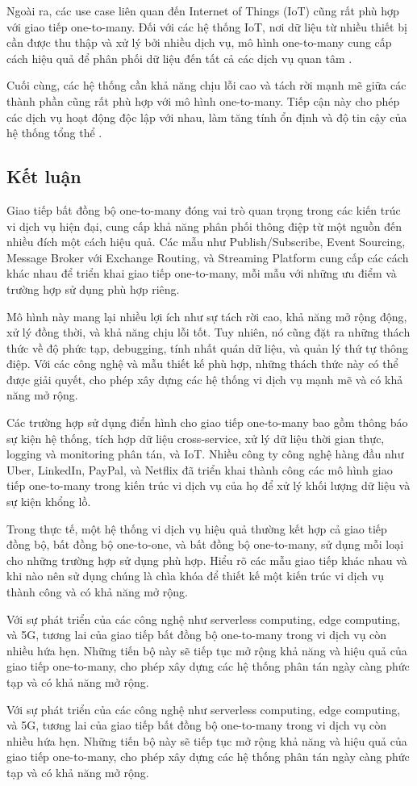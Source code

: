 Ngoài ra, các use case liên quan đến Internet of Things (IoT) cũng rất phù hợp với giao tiếp one-to-many. Đối với các hệ thống IoT, nơi dữ liệu từ nhiều thiết bị cần được thu thập và xử lý bởi nhiều dịch vụ, mô hình one-to-many cung cấp cách hiệu quả để phân phối dữ liệu đến tất cả các dịch vụ quan tâm \cite{indrasiri2020}.

Cuối cùng, các hệ thống cần khả năng chịu lỗi cao và tách rời mạnh mẽ giữa các thành phần cũng rất phù hợp với mô hình one-to-many. Tiếp cận này cho phép các dịch vụ hoạt động độc lập với nhau, làm tăng tính ổn định và độ tin cậy của hệ thống tổng thể \cite{fowler2002}.

\subsection{Kết luận}
Giao tiếp bất đồng bộ one-to-many đóng vai trò quan trọng trong các kiến trúc vi dịch vụ hiện đại, cung cấp khả năng phân phối thông điệp từ một nguồn đến nhiều đích một cách hiệu quả. Các mẫu như Publish/Subscribe, Event Sourcing, Message Broker với Exchange Routing, và Streaming Platform cung cấp các cách khác nhau để triển khai giao tiếp one-to-many, mỗi mẫu với những ưu điểm và trường hợp sử dụng phù hợp riêng.

Mô hình này mang lại nhiều lợi ích như sự tách rời cao, khả năng mở rộng động, xử lý đồng thời, và khả năng chịu lỗi tốt. Tuy nhiên, nó cũng đặt ra những thách thức về độ phức tạp, debugging, tính nhất quán dữ liệu, và quản lý thứ tự thông điệp. Với các công nghệ và mẫu thiết kế phù hợp, những thách thức này có thể được giải quyết, cho phép xây dựng các hệ thống vi dịch vụ mạnh mẽ và có khả năng mở rộng.

Các trường hợp sử dụng điển hình cho giao tiếp one-to-many bao gồm thông báo sự kiện hệ thống, tích hợp dữ liệu cross-service, xử lý dữ liệu thời gian thực, logging và monitoring phân tán, và IoT. Nhiều công ty công nghệ hàng đầu như Uber, LinkedIn, PayPal, và Netflix đã triển khai thành công các mô hình giao tiếp one-to-many trong kiến trúc vi dịch vụ của họ để xử lý khối lượng dữ liệu và sự kiện khổng lồ.

Trong thực tế, một hệ thống vi dịch vụ hiệu quả thường kết hợp cả giao tiếp đồng bộ, bất đồng bộ one-to-one, và bất đồng bộ one-to-many, sử dụng mỗi loại cho những trường hợp sử dụng phù hợp. Hiểu rõ các mẫu giao tiếp khác nhau và khi nào nên sử dụng chúng là chìa khóa để thiết kế một kiến trúc vi dịch vụ thành công và có khả năng mở rộng.

Với sự phát triển của các công nghệ như serverless computing, edge computing, và 5G, tương lai của giao tiếp bất đồng bộ one-to-many trong vi dịch vụ còn nhiều hứa hẹn. Những tiến bộ này sẽ tiếp tục mở rộng khả năng và hiệu quả của giao tiếp one-to-many, cho phép xây dựng các hệ thống phân tán ngày càng phức tạp và có khả năng mở rộng.

Với sự phát triển của các công nghệ như serverless computing, edge computing, và 5G, tương lai của giao tiếp bất đồng bộ one-to-many trong vi dịch vụ còn nhiều hứa hẹn. Những tiến bộ này sẽ tiếp tục mở rộng khả năng và hiệu quả của giao tiếp one-to-many, cho phép xây dựng các hệ thống phân tán ngày càng phức tạp và có khả năng mở rộng.